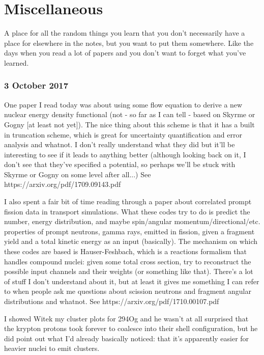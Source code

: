 \chapter{Miscellaneous}
\maketitle

A place for all the random things you learn that you don't necessarily have a place for elsewhere in the notes, but you want to put them somewhere. Like the days when you read a lot of papers and you don't want to forget what you've learned.

\subsection*{3 October 2017}
One paper I read today was about using some flow equation to derive a new nuclear energy density functional (not - so far as I can tell - based on Skyrme or Gogny [at least not yet]). The nice thing about this scheme is that it has a built in truncation scheme, which is great for uncertainty quantification and error analysis and whatnot. I don't really understand what they did but it'll be interesting to see if it leads to anything better (although looking back on it, I don't see that they've specified a potential, so perhaps we'll be stuck with Skyrme or Gogny on some level after all...) See https://arxiv.org/pdf/1709.09143.pdf

I also spent a fair bit of time reading through a paper about correlated prompt fission data in transport simulations. What these codes try to do is predict the number, energy distribution, and maybe spin/angular momentum/directional/etc. properties of prompt neutrons, gamma rays, emitted in fission, given a fragment yield and a total kinetic energy as an input (basically). The mechanism on which these codes are based is Hauser-Feshbach, which is a reactions formalism that handles compound nuclei: given some total cross section, try to reconstruct the possible input channels and their weights (or something like that). There's a lot of stuff I don't understand about it, but at least it gives me something I can refer to when people ask me questions about scission neutrons and fragment angular distributions and whatnot. See https://arxiv.org/pdf/1710.00107.pdf

I showed Witek my cluster plots for 294Og and he wasn't at all surprised that the krypton protons took forever to coalesce into their shell configuration, but he did point out what I'd already basically noticed: that it's apparently easier for heavier nuclei to emit clusters.